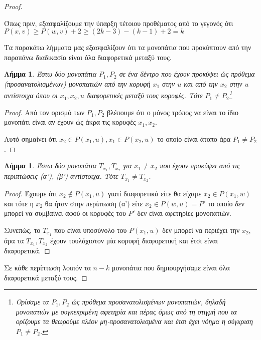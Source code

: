 \documentclass[a4paper, oneside, 11pt]{article}
\newtheorem{lm}[thm]{Λήμμα}
\theoremstyle{definition}
\begin{document}
\begin{enumerate}
\begin{proof}
\begin{enumerate}
               Όπως πριν, εξασφαλίζουμε την ύπαρξη τέτοιου προθέματος
               από το γεγονός ότι $P(x, v) \geq P(w, v) + 2 \geq
               (2k-3) - (k-1) + 2 = k$
      \end{enumerate}

      Τα παρακάτω λήμματα μας εξασφαλίζουν ότι τα μονοπάτια που προκύπτουν
      από την παραπάνω διαδικασία είναι όλα διαφορετικά μεταξύ τους.

      \begin{lm}
         Έστω δύο μονοπάτια $P_1, P_2$ σε ένα δέντρο που έχουν προκύψει ώς
         πρόθεμα (προσανατολισμένων) μονοπατιών από την κορυφή $x_1$ στην $u$ και
         από την $x_2$ στην $u$ αντίστοιχα όπου οι $x_1, x_2, u$ διαφορετικές
         μεταξύ τους κορυφές. Τότε $P_1 \neq P_2$\footnote{Ορίσαμε τα $P_1, P_2$
         ώς πρόθεμα προσανατολισμένων μονοπατιών, δηλαδή μονοπατιών
         με συγκεκριμένη αφετηρία και πέρας όμως από τη στιγμή που τα ορίζουμε
         τα θεωρούμε πλέον μη-προσανατολισμένα και έτσι έχει νόημα η σύγκριση
         $P_1 \neq P_2$.}
      \end{lm}
      \begin{proof}
         Από τον ορισμό των $P_1, P_2$ βλέπουμε ότι ο μόνος τρόπος να
         είναι το ίδιο μονοπάτι είναι αν έχουν ώς άκρα τις κορυφές
         $x_1, x_2$.

         Αυτό σημαίνει ότι $x_2 \in P(x_1, u), x_1 \in P(x_2, u)$ το οποίο
         είναι άτοπο άρα $P_1 \neq P_2$.
      \end{proof}

      \begin{lm}
      Έστω δύο μονοπάτια $T_{x_1}, T_{x_2}$ για $x_1 \neq x_2$ που έχουν προκύψει
      από τις περιπτώσεις (α'), (β') αντίστοιχα. Τότε $T_{x_1} \neq T_{x_2}$.
      \end{lm}

      \begin{proof}
      Έχουμε ότι
      $x_2 \notin P(x_1, u)$ γιατί διαφορετικά είτε θα είχαμε
      $x_2 \in P(x_1, w)$ και τότε η $x_2$ θα ήταν στην περίπτωση (α') είτε
      $x_2 \in P(w, u) = P'$ το οποίο
      δεν μπορεί να συμβαίνει αφού οι κορυφές του $P'$ δεν είναι αφετηρίες
      μονοπατιών.

      Συνεπώς, το $T_{x_1}$ που είναι υποσύνολο του $P(x_1, u)$ δεν μπορεί
      να περιέχει την $x_2$, άρα τα $T_{x_1}, T_{x_2}$ έχουν τουλάχιστον
      μία κορυφή διαφορετική και έτσι είναι διαφορετικά.
      \end{proof}

      Σε κάθε περίπτωση λοιπόν τα $n-k$ μονοπάτια που δημιουργήσαμε
      είναι όλα διαφορετικά μεταξύ τους.
      \end{proof}
\end{enumerate}
\end{document}
